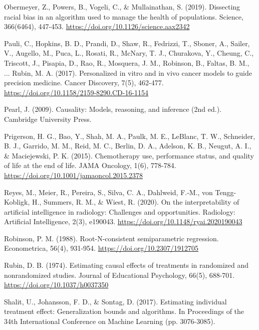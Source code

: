 Obermeyer, Z., Powers, B., Vogeli, C., \& Mullainathan, S. (2019). Dissecting racial bias in an algorithm used to manage the health of populations. Science, 366(6464), 447-453. \href{https://www.science.org/doi/10.1126/science.aax2342}{https://doi.org/10.1126/science.aax2342}

Pauli, C., Hopkins, B. D., Prandi, D., Shaw, R., Fedrizzi, T., Sboner, A., Sailer, V., Augello, M., Puca, L., Rosati, R., McNary, T. J., Churakova, Y., Cheung, C., Triscott, J., Pisapia, D., Rao, R., Mosquera, J. M., Robinson, B., Faltas, B. M., ... Rubin, M. A. (2017). Personalized in vitro and in vivo cancer models to guide precision medicine. Cancer Discovery, 7(5), 462-477. \href{https://aacrjournals.org/cancerdiscovery/article/7/5/462/6239/Personalized-In-Vitro-and-In-Vivo-Cancer-Models-to}{https://doi.org/10.1158/2159-8290.CD-16-1154}

Pearl, J. (2009). Causality: Models, reasoning, and inference (2nd ed.). Cambridge University Press.

Prigerson, H. G., Bao, Y., Shah, M. A., Paulk, M. E., LeBlanc, T. W., Schneider, B. J., Garrido, M. M., Reid, M. C., Berlin, D. A., Adelson, K. B., Neugut, A. I., \& Maciejewski, P. K. (2015). Chemotherapy use, performance status, and quality of life at the end of life. JAMA Oncology, 1(6), 778-784. \href{https://jamanetwork.com/journals/jamaoncology/fullarticle/2398177}{https://doi.org/10.1001/jamaoncol.2015.2378}

Reyes, M., Meier, R., Pereira, S., Silva, C. A., Dahlweid, F.-M., von Tengg-Kobligk, H., Summers, R. M., \& Wiest, R. (2020). On the interpretability of artificial intelligence in radiology: Challenges and opportunities. Radiology: Artificial Intelligence, 2(3), e190043. \href{https://pubs.rsna.org/doi/10.1148/ryai.2020190043}{https://doi.org/10.1148/ryai.2020190043}

Robinson, P. M. (1988). Root-N-consistent semiparametric regression. Econometrica, 56(4), 931-954. \href{https://www.jstor.org/stable/1912705?origin=crossref}{https://doi.org/10.2307/1912705}

Rubin, D. B. (1974). Estimating causal effects of treatments in randomized and nonrandomized studies. Journal of Educational Psychology, 66(5), 688-701. \href{https://psycnet.apa.org/doiLanding?doi=10.1037\%2Fh0037350}{https://doi.org/10.1037/h0037350}

Shalit, U., Johansson, F. D., \& Sontag, D. (2017). Estimating individual treatment effect: Generalization bounds and algorithms. In Proceedings of the 34th International Conference on Machine Learning (pp. 3076-3085).

